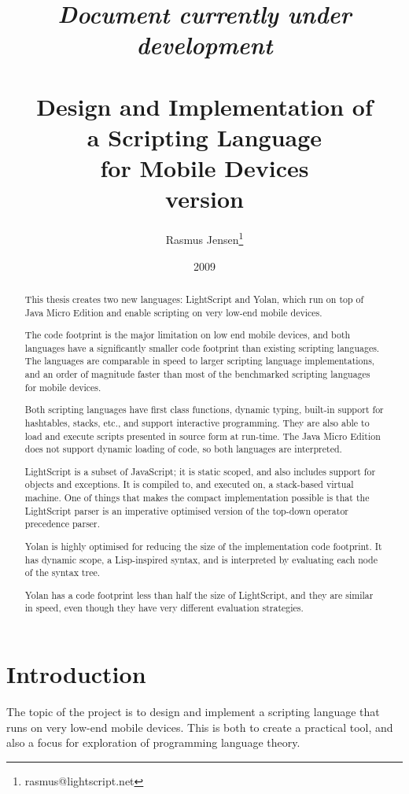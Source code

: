 \documentclass[11pt]{report}
\title{
\emph{Document currently under development} \\ ~ \\
Design and Implementation of \\
a Scripting Language \\ 
for Mobile Devices \\
{\scriptsize version }}
\author{
  Rasmus Jensen\footnote{
    rasmus@lightscript.net
  }
}
\date{2009}
\begin{document}

\maketitle
\begin{abstract}
This thesis creates two new languages: LightScript and Yolan, which run on top of Java Micro Edition and enable scripting on very low-end mobile devices.

The code footprint is the major limitation on low end mobile devices, and both languages have a significantly smaller code footprint than existing scripting languages. 
The languages are comparable in speed to larger scripting language implementations,
and an order of magnitude faster than most of the benchmarked scripting languages for mobile devices.

Both scripting languages have first class functions, dynamic typing, built-in support for hashtables, stacks, etc., and support interactive programming. They are also able to load and execute scripts presented in source form at run-time. 
The Java Micro Edition does not support dynamic loading of code, so both languages are interpreted.

LightScript is a subset of JavaScript; it is static scoped, and also includes support for objects and exceptions. It is compiled to, and executed on, a stack-based virtual machine. One of things that makes the compact implementation possible is that the LightScript parser is an imperative optimised version of the top-down operator precedence parser.

Yolan is highly optimised for reducing the size of the implementation code footprint. It has dynamic scope, a Lisp-inspired syntax, and is interpreted by evaluating each node of the syntax tree.

Yolan has a code footprint less than half the size of LightScript, and they are similar in speed, even though they have very different evaluation strategies.
\end{abstract}

\setcounter{tocdepth}{1}
\tableofcontents

\chapter{Introduction}

    The topic of the project is to design and implement a scripting language
that runs on very low-end mobile devices. This is both to create a practical tool, and
also a focus for exploration of programming language theory. 
\end{document}
